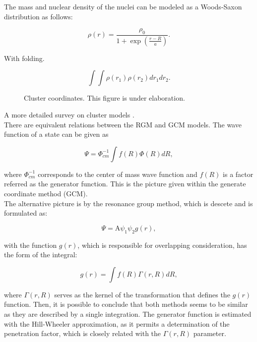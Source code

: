 \documentclass[openany]{book}
\begin{document}
The mass and nuclear density of the nuclei can be modeled as a Woods-Saxon distribution as follows:

\begin{equation} \label{eq:micro_density}
	\rho(r) = \frac{\rho_0}{1 + \exp{\left(\frac{r - R}{a}\right)}}.
\end{equation} 

With folding.

\begin{equation}  \label{eq:micro_folding}
	\int \int \rho(r_1) \rho(r_2) dr_1 dr_2. 
\end{equation}

\begin{figure}[H]
	
	\caption[Cluster coordinates]{Cluster coordinates. This figure is under elaboration.}
	\label{fig:clusterCoordinates}
\end{figure}

A more detailed survey on cluster models \cite{beck_2012}. \\

There are equivalent relations between the RGM and GCM models. The wave function of a state can be given as

\begin{equation}\label{eq:micro_cluster_equivalency_RGM}
	\Psi = \Phi^{-1}_{cm} \int f(R) \Phi(R) dR,
\end{equation}

where $\Phi^{-1}_{cm}$ corresponds to the center of mass wave function and $f(R)$ is a factor referred as the generator function. This is the picture given within the generate coordinate method (GCM). \\

The alternative picture is by the resonance group method, which is descete and is formulated as:

\begin{equation}\label{eq:micro_cluster_equivalency_GCM}
	\Psi = \mathrm{A} \psi_1 \psi_2 g(r), 
\end{equation}

with the function $g(r)$, which is responsible for overlapping consideration, has the form of the integral: 

\begin{equation}\label{eq:micro_cluster_equivalency_GCM_g}
	g(r) = \int f(R) \Gamma(r, R) dR,
\end{equation}

where $\Gamma(r, R)$ serves as the kernel of the transformation that defines the $g(r)$ function. Then, it is possible to conclude that both methods seems to be similar as they are described by a single integration. The generator function is estimated with the Hill-Wheeler approximation, as it permits a determination of the penetration factor, which is closely related with the $\Gamma(r, R)$ parameter. \\
\end{document}

